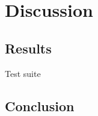 \documentclass{report}
\begin{document}








\chapter{Discussion}

\section{Results}

Test suite




\section{Conclusion}




\end{document}
